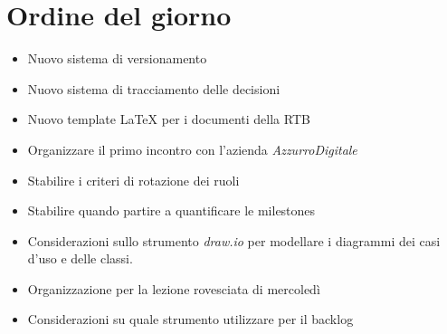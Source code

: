

\section{Ordine del giorno}

\begin{itemize}
    \item Nuovo sistema di versionamento 
    \item Nuovo sistema di tracciamento delle decisioni
    \item Nuovo template LaTeX per i documenti della RTB
    \item Organizzare il primo incontro con l'azienda \emph{AzzurroDigitale}
    \item Stabilire i criteri di rotazione dei ruoli
    \item Stabilire quando partire a quantificare le milestones
    \item Considerazioni sullo strumento \emph{draw.io} per modellare i diagrammi dei casi d'uso e delle classi.
    \item Organizzazione per la lezione rovesciata di mercoledì 
    \item Considerazioni su quale strumento utilizzare per il backlog
\end{itemize}
